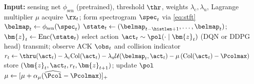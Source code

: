 \begin{algorithm}[t]
\caption{LA-JSSA training (one episode)}
\label{alg:lajssa}
\begin{algorithmic}[1]
\State \textbf{Input:} sensing net $\phi_{\mathrm{sen}}$ (pretrained),
threshold $\thr$, weights $\lambda_{\mathrm{c}},\lambda_{\mathrm{u}}$,
Lagrange multiplier $\mu$
  \State acquire $\rx_t$; form spectrogram $\spec_t$ via \eqref{eq:stft}
  \State $\belmap_t \gets \phi_{\mathrm{sen}}(\spec_t)$
  \State $\state_t \gets (\belmap_{t-\histlen+1},\dots,\belmap_t)$;
         $\bm{z}_t \gets \mathrm{Enc}(\state_t)$
  \State select action $\act_t \sim \pol(\cdot\mid\bm{z}_t)$
         (DQN or DDPG head)
  \State transmit; observe ACK $\obs_t$ and collision indicator
  \State $r_t \gets \thru(\act_t) - \lambda_{\mathrm{c}}\mathrm{Col}(\act_t)
         - \lambda_{\mathrm{u}}\mathcal{U}(\belmap_t,\act_t)
         - \mu\,(\mathrm{Col}(\act_t)-\Pcolmax)$
  \State store $(\bm{z}_t,\act_t,r_t,\bm{z}_{t+1})$; update $\pol$
  \State $\mu \gets [\mu + \alpha_\mu(\widehat{\Pcol}-\Pcolmax)]_+$
\EndFor
\end{algorithmic}
\end{algorithm}
